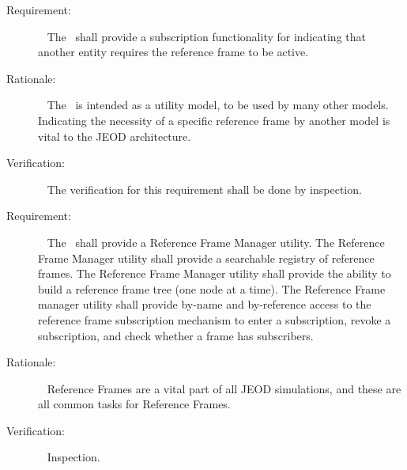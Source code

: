 \label{reqt:refframe_subscription}
\begin{description}
\item[Requirement:]\ \newline
The \ shall provide a subscription functionality for indicating
that another entity requires the reference frame to be active.
\item[Rationale:]\ \newline
The \ is intended as a utility model, to be used by many other
models. Indicating the necessity of a specific reference frame by another model
is vital to the JEOD architecture.
\item[Verification:]\ \newline
The verification for this requirement shall be done by inspection.
\end{description}

\label{reqt:refframe_manager}
\begin{description}
\item[Requirement:]\ \newline
The \ shall provide a Reference Frame Manager utility.
   \label{reqt:refframe_search_registry}
   The Reference Frame Manager utility shall provide a searchable registry of reference frames.
   \label{reqt:refframe_tree_build}
   The Reference Frame Manager utility shall provide the ability to build a reference frame
   tree (one node at a time).
   \label{reqt:refframe_subscription_mechanism}
   The Reference Frame manager utility shall provide by-name and by-reference access to the reference
   frame subscription mechanism to enter a subscription, revoke a subscription, and check
   whether a frame has subscribers.
\item[Rationale:]\ \newline
   Reference Frames are a vital part of all JEOD simulations, and these are all common
   tasks for Reference Frames.
\item[Verification:]\ \newline
   Inspection.
\end{description}



%
%
%
%
%

